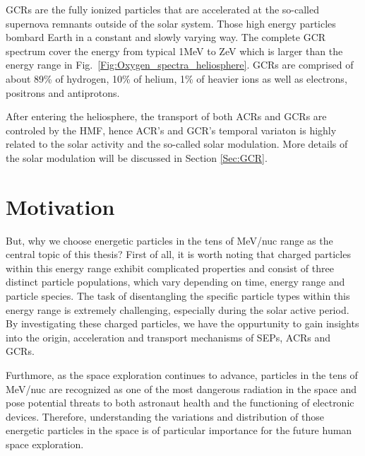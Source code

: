 \acp{GCR} are the fully ionized particles that are accelerated at the so-called supernova remnants \citep{Blasi2013AARv2013} outside of the solar system. Those high energy particles bombard Earth in a constant and slowly varying way. The complete GCR spectrum cover the energy from typical 1MeV \citep{Potgieter2013LRSP} to ZeV which is larger than the energy range in Fig.~\ref{Fig:Oxygen_spectra_heliosphere}. \acp{GCR} are comprised of about 89\% of hydrogen, 10\% of helium, 1\% of heavier ions as well as electrons, positrons and antiprotons. 

After entering the heliosphere, the transport of both \acp{ACR} and \acp{GCR} are controled by the \ac{HMF}, hence \ac{ACR}'s and \ac{GCR}'s temporal variaton is highly related to the solar activity and the so-called solar modulation. More details of the solar modulation will be discussed in Section \ref{Sec:GCR}.









\section{Motivation}
But, why we choose energetic particles in the tens of MeV/nuc range as the central topic of this thesis? First of all, it is worth noting that charged particles within this energy range exhibit complicated properties and consist of three distinct particle populations, which vary depending on time, energy range and particle species. The task of disentangling the specific particle types within this energy range is extremely challenging, especially during the solar active period.
By investigating these charged particles, we have the oppurtunity to gain insights into the origin, acceleration and transport mechanisms of \acp{SEP}, \acp{ACR} and \acp{GCR}.

Furthmore, as the space exploration continues to advance, particles in the tens of MeV/nuc are recognized as one of the most dangerous radiation in the space and pose potential threats to both astronaut health and the functioning of electronic devices. Therefore, understanding the variations and distribution of those energetic particles in the space is of particular importance for the future human space exploration.

